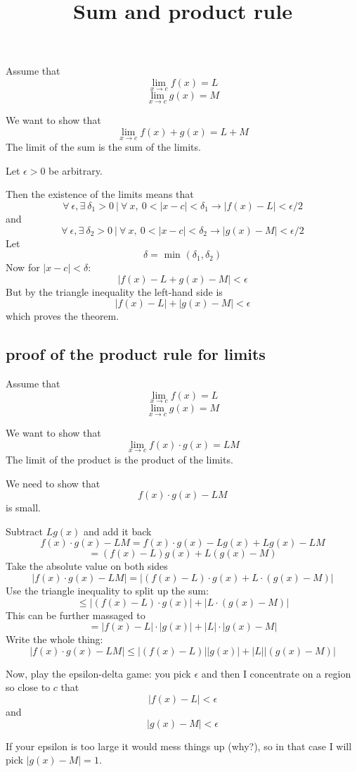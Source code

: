 \documentclass[11pt, oneside]{article}   	%
\title{Sum and product rule}
\date{}							%
\begin{document}
\maketitle
\Large

Assume that
\[ \lim_{x \rightarrow c} f(x) = L \]
\[ \lim_{x \rightarrow c} g(x) = M \]

We want to show that
\[ \lim_{x \rightarrow c} f(x) + g(x) = L + M \]
The limit of the sum is the sum of the limits.

Let $\epsilon > 0$ be arbitrary.

Then the existence of the limits means that
\[ \forall \ \epsilon, \exists \ \delta_1 > 0 \ | \ \forall \ x, \ 0 < | x - c| < \delta_1 \rightarrow | f(x) - L | < \epsilon/2 \]
and
\[ \forall \ \epsilon, \exists \ \delta_2 > 0 \ | \ \forall \ x, \ 0 < | x - c| < \delta_2 \rightarrow | g(x) - M | < \epsilon/2 \]
Let
\[ \delta = \text{ min } (\delta_1, \delta_2) \]
Now for $|x - c| < \delta$:
\[ | f(x) - L + g(x) - M| < \epsilon \]
But by the triangle inequality the left-hand side is 
\[   | f(x) - L| + |g(x) - M| < \epsilon \]
which proves the theorem.

\subsection*{proof of the product rule for limits}
Assume that
\[ \lim_{x \rightarrow c} f(x) = L \]
\[ \lim_{x \rightarrow c} g(x) = M \]

We want to show that
\[ \lim_{x \rightarrow c} f(x) \cdot g(x) = LM \]
The limit of the product is the product of the limits.

We need to show that
\[ f(x) \cdot g(x) - LM \]
is small.  

Subtract $L g(x)$ and add it back
\[ f(x) \cdot g(x) - LM = f(x) \cdot g(x) - L g(x) + L g(x) - LM \]
\[ = (f(x) - L) g(x) + L (g(x) - M ) \]
Take the absolute value on both sides
\[  |f(x) \cdot g(x) - LM| = |(f(x) - L) \cdot g(x) + L \cdot (g(x) - M )| \]
Use the triangle inequality to split up the sum:
\[ \le |(f(x) - L) \cdot g(x)| + |L \cdot (g(x) - M )| \]
This can be further massaged to 
\[  =| f(x) - L | \cdot |g(x)| + |L| \cdot |g(x) - M | \]
Write the whole thing:
\[ |f(x) \cdot g(x) - LM| \le |(f(x) - L) | | g(x) | + | L | | (g(x) - M )| \]

Now, play the epsilon-delta game:  you pick $\epsilon$ and then I concentrate on a region so close to $c$ that
\[ |f(x) - L | < \epsilon \]
and
\[ |g(x) - M | < \epsilon \]

If your epsilon is too large it would mess things up (why?), so in that case I will pick $|g(x) - M| = 1$.
\end{document}
